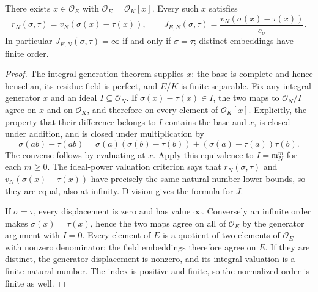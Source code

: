\begin{lemma}
\label{fw:embedding-pair-generator}
\leanok
There exists $x\in\mathcal O_E$ with
$\mathcal O_E=\mathcal O_K[x]$. Every such $x$ satisfies
\[
 r_N(\sigma,\tau)=v_N(\sigma(x)-\tau(x)),\qquad
 J_{E,N}(\sigma,\tau)=\frac{v_N(\sigma(x)-\tau(x))}{e_\sigma}.
\]
In particular $J_{E,N}(\sigma,\tau)=\infty$ if and only if
$\sigma=\tau$; distinct embeddings have finite order.
\end{lemma}
\begin{proof}
The integral-generation theorem supplies $x$: the base is complete
and hence henselian, its residue field is perfect, and $E/K$ is
finite separable. Fix any integral generator $x$ and an ideal
$I\subseteq\mathcal O_N$. If
$\sigma(x)-\tau(x)\in I$, the two maps to $\mathcal O_N/I$ agree
on $x$ and on $\mathcal O_K$, and therefore on every element of
$\mathcal O_K[x]$. Explicitly, the property that their difference
belongs to $I$ contains the base and $x$, is closed under addition,
and is closed under multiplication by
\[
 \sigma(ab)-\tau(ab)
 =\sigma(a)(\sigma(b)-\tau(b))
   +(\sigma(a)-\tau(a))\tau(b).
\]
The converse follows by evaluating at $x$. Apply this equivalence
to $I=\mathfrak m_N^m$ for each $m\geq0$. The ideal-power
valuation criterion says that $r_N(\sigma,\tau)$ and
$v_N(\sigma(x)-\tau(x))$ have precisely the same natural-number
lower bounds, so they are equal, also at infinity. Division gives
the formula for $J$.

If $\sigma=\tau$, every displacement is zero and has value
$\infty$. Conversely an infinite order makes
$\sigma(x)=\tau(x)$, hence the two maps agree on all of
$\mathcal O_E$ by the generator argument with $I=0$.
Every element of $E$ is a quotient of two elements of
$\mathcal O_E$ with nonzero denominator; the field embeddings
therefore agree on $E$. If they are distinct, the generator
displacement is nonzero, and its integral valuation is a finite
natural number. The index is positive and finite, so the normalized
order is finite as well.
\end{proof}

